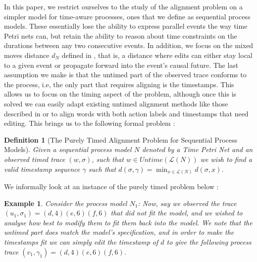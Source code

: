 \documentclass[conference]{IEEEtran}
\newcommand\eye{\ensurestackMath{\stackinset{c}{}{c}{-.33pt}%
		{\bullet}{\bigcirc}}}
\newtheorem{definition}{Definition}
\newtheorem{example}{Example}
\begin{document}
	In this paper, we restrict ourselves to the study of the alignment problem on a simpler model for time-aware processes, ones that we define as sequential process models. These essentially lose the ability to express parallel events the way time Petri nets can, but retain the ability to reason about time constraints on the durations between any two consecutive events. In addition, we focus on the mixed moves distance $d_N$ defined in \cite{CR22}, that is, a distance where edits can either stay local to a given event or propagate forward into the event's causal future. The last assumption we make is that the untimed part of the observed trace conforms to the process, i.e, the only part that requires aligning is the timestamps. This allows us to focus on the timing aspect of the problem, although once this is solved we can easily adapt existing untimed alignment methods like those described in \cite{Adriansyah2014AligningOA} or \cite{BCC21} to align words with both action labels and timestamps that need editing. This brings us to the following formal problem : 
	
	\begin{definition}[The Purely Timed Alignment Problem for Sequential Process Models]
		Given a sequential process model $N$ denoted by a Time Petri Net and an observed timed trace $(w, \sigma)$, such that $w \in Untime(\mathcal{L}(N))$ we wish to find a valid timestamp sequence $\gamma$ such that $d(\sigma, \gamma) = \min_{x \in \mathcal{L}(N)} d(\sigma, x)$.
	\end{definition}
	
	We informally look at an instance of the purely timed problem below : 
	
	\begin{example}
	Consider the process model $N_1$:  
	\adjustbox{scale = 0.9}{
		\begin{tikzcd}
			&{}&& {}&&{} & \\
			\eye &\fbox{d}& \bigcirc & {\fbox{e}} & \bigcirc & \fbox{f} & \bigcirc_f\\
			\arrow[from=2-1, to=2-2]
			\arrow[ from=2-2, to=2-3]
			\arrow[from=2-3, to=2-4]
			\arrow[from=2-4, to=2-5]
			\arrow[from=2-5, to=2-6]
			\arrow[from=2-6, to=2-7]
			\arrow["{[1,3]}"{description, pos=0.2}, draw=white, from=2-2, to=1-2]
			\arrow["{[1,4]}"{description, pos=0.3}, draw=white, from=2-4, to=1-4]
			\arrow["{[0, 3]}"{description, pos=0.2}, draw=white, from=2-6, to=1-6]
		\end{tikzcd}
	}
Now, say we observed the trace $(u_1, \sigma_1) = (d, 4)(e, 6)(f, 6)$ that did not fit the model, and we wished to analyse how best to modify them to fit them back into the model. We note that the untimed part does match the model's specification, and in order to make the timestamps fit we can simply edit the timestamp of $d$ to give the following process trace $(v_1, \gamma_1) = (d, 4)(e, 6)(f, 6)$. 
	
	
	\end{example}
\end{document}
